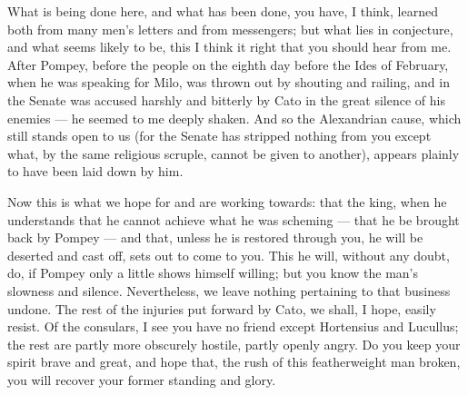 

 What is being done here, and what has been done, you have, I think, learned both from many men's letters and from messengers; but what lies in conjecture, and what seems likely to be, this I think it right that you should hear from me. After Pompey, before the people on the eighth day before the Ides of February, when he was speaking for Milo, was thrown out by shouting and railing, and in the Senate was accused harshly and bitterly by Cato in the great silence of his enemies --- he seemed to me deeply shaken. And so the Alexandrian cause, which still stands open to us (for the Senate has stripped nothing from you except what, by the same religious scruple, cannot be given to another), appears plainly to have been laid down by him.

 Now this is what we hope for and are working towards: that the king, when he understands that he cannot achieve what he was scheming --- that he be brought back by Pompey --- and that, unless he is restored through you, he will be deserted and cast off, sets out to come to you. This he will, without any doubt, do, if Pompey only a little shows himself willing; but you know the man's slowness and silence. Nevertheless, we leave nothing pertaining to that business undone. The rest of the injuries put forward by Cato, we shall, I hope, easily resist. Of the consulars, I see you have no friend except Hortensius and Lucullus; the rest are partly more obscurely hostile, partly openly angry. Do you keep your spirit brave and great, and hope that, the rush of this featherweight man broken, you will recover your former standing and glory.
